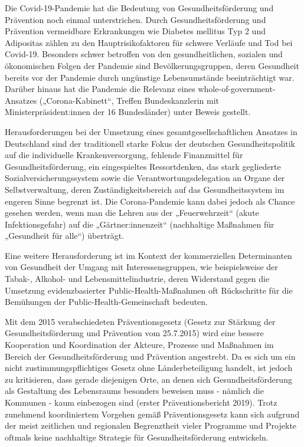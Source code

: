 \documentclass{article}
\begin{document}
Die Covid-19-Pandemie hat die Bedeutung von Gesundheitsförderung und Prävention noch einmal unterstrichen. Durch Gesundheitsförderung und Prävention vermeidbare Erkrankungen wie Diabetes mellitus Typ 2 und Adipositas zählen zu den Hauptrisikofaktoren für schwere Verläufe und Tod bei Covid-19. Besonders schwer betroffen von den gesundheitlichen, sozialen und ökonomischen Folgen der Pandemie sind Bevölkerungsgruppen, deren Gesundheit bereits vor der Pandemie durch ungünstige Lebensumstände beeinträchtigt war. Darüber hinaus hat die Pandemie die Relevanz eines whole-of-government-Ansatzes („Corona-Kabinett“, Treffen Bundeskanzlerin mit Ministerpräsident:innen der 16 Bundesländer) unter Beweis gestellt.


Herausforderungen bei der Umsetzung eines gesamtgesellschaftlichen Ansatzes in Deutschland sind der traditionell starke Fokus der deutschen Gesundheitspolitik auf die individuelle Krankenversorgung, fehlende Finanzmittel für Gesundheitsförderung, ein eingespieltes Ressortdenken, das stark gegliederte Sozialversicherungssystem sowie die Verantwortungsdelegation an Organe der Selbstverwaltung, deren Zuständigkeitsbereich auf das Gesundheitssystem im engeren Sinne begrenzt ist. Die Corona-Pandemie kann dabei jedoch als Chance gesehen werden, wenn man die Lehren aus der „Feuerwehrzeit“ (akute Infektionsgefahr) auf die „Gärtner:innenzeit“ (nachhaltige Maßnahmen für „Gesundheit für alle“) überträgt. 


Eine weitere Herausforderung ist im Kontext der kommerziellen Determinanten von Gesundheit der Umgang mit Interessensgruppen, wie beispielsweise der Tabak-, Alkohol- und Lebensmittelindustrie, deren Widerstand gegen die Umsetzung evidenzbasierter Public-Health-Maßnahmen oft Rückschritte für die Bemühungen der Public-Health-Gemeinschaft bedeuten.


Mit dem 2015 verabschiedeten Präventionsgesetz (Gesetz zur Stärkung der Gesundheitsförderung und Prävention vom 25.7.2015) wird eine bessere Kooperation und Koordination der Akteure, Prozesse und Maßnahmen im Bereich der Gesundheitsförderung und Prävention angestrebt. Da es sich um ein nicht zustimmungspflichtiges Gesetz ohne Länderbeteiligung handelt, ist jedoch zu kritisieren, dass gerade diejenigen Orte, an denen sich Gesundheitsförderung als Gestaltung des Lebensraums besonders beweisen muss - nämlich die Kommunen - kaum einbezogen sind (erster Präventionsbericht 2019). Trotz zunehmend koordiniertem Vorgehen gemäß Präventionsgesetz kann sich aufgrund der meist zeitlichen und regionalen Begrenztheit vieler Programme und Projekte oftmals keine nachhaltige Strategie für Gesundheitsförderung entwickeln.
\end{document}
